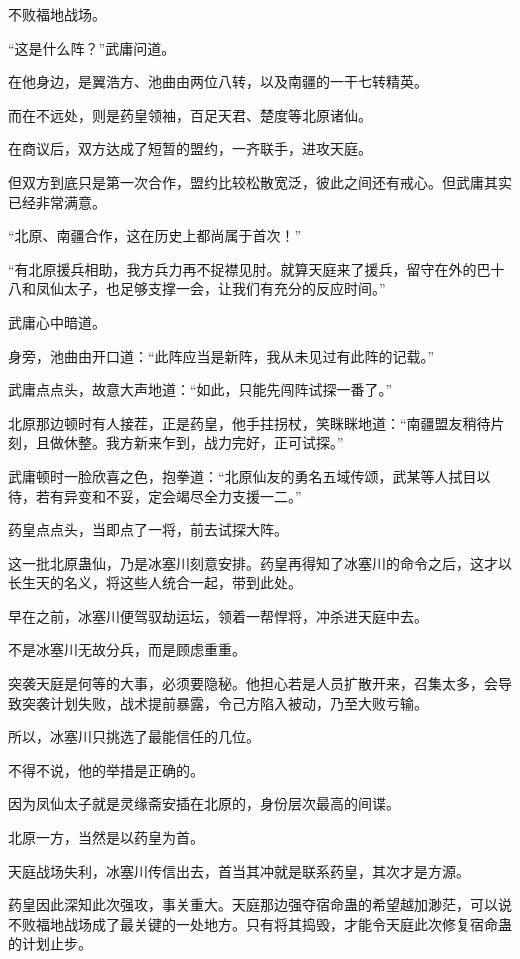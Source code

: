 
\begin{this_body}

不败福地战场。

“这是什么阵？”武庸问道。

在他身边，是翼浩方、池曲由两位八转，以及南疆的一干七转精英。

而在不远处，则是药皇领袖，百足天君、楚度等北原诸仙。

在商议后，双方达成了短暂的盟约，一齐联手，进攻天庭。

但双方到底只是第一次合作，盟约比较松散宽泛，彼此之间还有戒心。但武庸其实已经非常满意。

“北原、南疆合作，这在历史上都尚属于首次！”

“有北原援兵相助，我方兵力再不捉襟见肘。就算天庭来了援兵，留守在外的巴十八和凤仙太子，也足够支撑一会，让我们有充分的反应时间。”

武庸心中暗道。

身旁，池曲由开口道：“此阵应当是新阵，我从未见过有此阵的记载。”

武庸点点头，故意大声地道：“如此，只能先闯阵试探一番了。”

北原那边顿时有人接茬，正是药皇，他手拄拐杖，笑眯眯地道：“南疆盟友稍待片刻，且做休整。我方新来乍到，战力完好，正可试探。”

武庸顿时一脸欣喜之色，抱拳道：“北原仙友的勇名五域传颂，武某等人拭目以待，若有异变和不妥，定会竭尽全力支援一二。”

药皇点点头，当即点了一将，前去试探大阵。

这一批北原蛊仙，乃是冰塞川刻意安排。药皇再得知了冰塞川的命令之后，这才以长生天的名义，将这些人统合一起，带到此处。

早在之前，冰塞川便驾驭劫运坛，领着一帮悍将，冲杀进天庭中去。

不是冰塞川无故分兵，而是顾虑重重。

突袭天庭是何等的大事，必须要隐秘。他担心若是人员扩散开来，召集太多，会导致突袭计划失败，战术提前暴露，令己方陷入被动，乃至大败亏输。

所以，冰塞川只挑选了最能信任的几位。

不得不说，他的举措是正确的。

因为凤仙太子就是灵缘斋安插在北原的，身份层次最高的间谍。

北原一方，当然是以药皇为首。

天庭战场失利，冰塞川传信出去，首当其冲就是联系药皇，其次才是方源。

药皇因此深知此次强攻，事关重大。天庭那边强夺宿命蛊的希望越加渺茫，可以说不败福地战场成了最关键的一处地方。只有将其捣毁，才能令天庭此次修复宿命蛊的计划止步。


\end{this_body}
